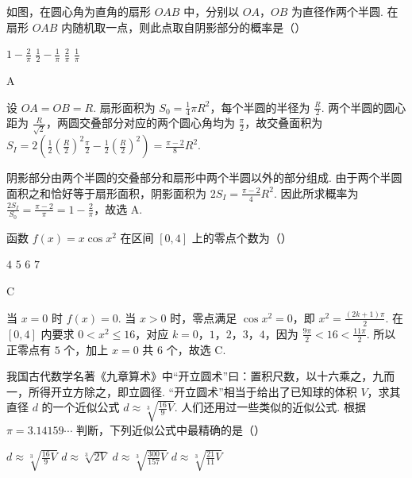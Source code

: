 \begin{problem}
如图，在圆心角为直角的扇形 \(OAB\) 中，分别以 \(OA\)，\(OB\) 为直径作两个半圆. 在扇形 \(OAB\) 内随机取一点，则此点取自阴影部分的概率是（\quad）


\choices
    {\(1 - \frac{2}{\pi}\)}
    {\(\frac{1}{2} -\frac{1}{\pi}\)}
    {\(\frac{2}{\pi}\)}
    {\(\frac{1}{\pi}\)}
\end{problem}

\begin{answer}
A
\end{answer}

\begin{solution}
设 \(OA=OB=R\). 扇形面积为 \(S_0=\frac14\pi R^2\)，每个半圆的半径为 \(\frac{R}{2}\). 两个半圆的圆心距为 \(\frac{R}{\sqrt2}\)，两圆交叠部分对应的两个圆心角均为 \(\frac{\pi}{2}\)，故交叠面积为 \(S_I=2\left(\frac12\left(\frac R2\right)^2\frac\pi2-\frac12\left(\frac R2\right)^2\right)=\frac{\pi-2}{8}R^2\).

阴影部分由两个半圆的交叠部分和扇形中两个半圆以外的部分组成. 由于两个半圆面积之和恰好等于扇形面积，阴影面积为 \(2S_I=\frac{\pi-2}{4}R^2\). 因此所求概率为 \(\displaystyle\frac{2S_I}{S_0}=\frac{\pi-2}{\pi}=1-\frac2\pi\)，故选 A.
\end{solution}

\begin{problem}
函数 \( f(x) = x\cos x^2 \) 在区间 \([0, 4]\) 上的零点个数为（\quad）

\choices
    {\(4\)}
    {\(5\)}
    {\(6\)}
    {\(7\)}
\end{problem}

\begin{answer}
C
\end{answer}

\begin{solution}
当 \(x=0\) 时 \(f(x)=0\). 当 \(x>0\) 时，零点满足 \(\cos x^2=0\)，即 \(x^2=\frac{(2k+1)\pi}{2}\). 在 \([0,4]\) 内要求 \(0<x^2\leqslant16\)，对应 \(k=0\)，\(1\)，\(2\)，\(3\)，\(4\)，因为 \(\frac{9\pi}{2}<16<\frac{11\pi}{2}\). 所以正零点有 \(5\) 个，加上 \(x=0\) 共 \(6\) 个，故选 C.
\end{solution}

\begin{problem}
我国古代数学名著《九章算术》中“开立圆术”曰：置积尺数，以十六乘之，九而一，所得开立方除之，即立圆径. “开立圆术”相当于给出了已知球的体积 \(V\)，求其直径 \(d\) 的一个近似公式 \(d \approx \sqrt[3]{\frac{16}{9} V}\). 人们还用过一些类似的近似公式. 根据 \(\pi = 3.14159 \cdots\) 判断，下列近似公式中最精确的是（\quad）

\choices
    {\(d \approx \sqrt[3]{\frac{16}{9} V}\)}
    {\(d \approx \sqrt[3]{2V}\)}
    {\(d \approx \sqrt[3]{\frac{300}{157}V}\)}
    {\(d \approx \sqrt[3]{\frac{21}{11}V}\)}
\end{problem}

